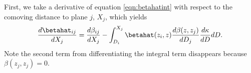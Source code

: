 First, we take a derivative of equation \ref{eqn:betahatint} with respect to the comoving distance to plane $j$, $X_j$, which yields
\begin{equation}
\frac{d\betahat_{i j}}{d X_j} = \frac{d\beta_{i j}}{d X_j} - \int_{D_i}^{X_j} \betahat(z_i, z) \frac{d \beta(z, z_j)}{d D_j} \frac{d \kappa}{d D} d D.
\end{equation}
Note the second term from differentiating the integral term disappears because $\beta(z_j, z_j) = 0$. 